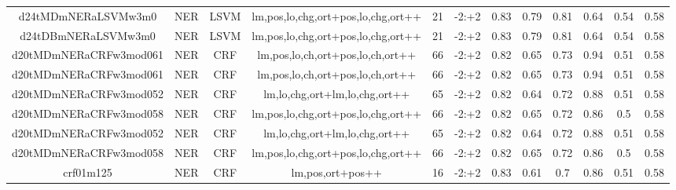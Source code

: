 \documentclass[a4paper]{article}
\begin{document}
\begin{landscape}
\begin{center}
\begin{tabular}{ |c|c|c|c|c|c|c|c|c|c|c|c|}
 
 	
 	\small{ d24tMDmNERaLSVMw3m0 } & \small{ NER} & \small{  LSVM }  & lm,pos,lo,chg,ort+pos,lo,chg,ort++  &  21 &  \small{  -2:+2 }  &  0.83 & 0.79 & 0.81  &  0.64 & 0.54 & 0.58 \\
 	

 
 	
 	\small{ d24tDBmNERaLSVMw3m0 } & \small{ NER} & \small{  LSVM }  & lm,pos,lo,chg,ort+pos,lo,chg,ort++  &  21 &  \small{  -2:+2 }  &  0.83 & 0.79 & 0.81  &  0.64 & 0.54 & 0.58 \\
 	

 
 	
 	\small{ d20tMDmNERaCRFw3mod061 } & \small{ NER} & \small{  CRF }  & lm,pos,lo,ch,ort+pos,lo,ch,ort++  &  66 &  \small{  -2:+2 }  &  0.82 & 0.65 & 0.73  &  0.94 & 0.51 & 0.58 \\
 	

 
 	
 	\small{ d20tMDmNERaCRFw3mod061 } & \small{ NER} & \small{  CRF }  & lm,pos,lo,ch,ort+pos,lo,ch,ort++  &  66 &  \small{  -2:+2 }  &  0.82 & 0.65 & 0.73  &  0.94 & 0.51 & 0.58 \\
 	

 
 	
 	\small{ d20tMDmNERaCRFw3mod052 } & \small{ NER} & \small{  CRF }  & lm,lo,chg,ort+lm,lo,chg,ort++  &  65 &  \small{  -2:+2 }  &  0.82 & 0.64 & 0.72  &  0.88 & 0.51 & 0.58 \\
 	

 
 	
 	\small{ d20tMDmNERaCRFw3mod058 } & \small{ NER} & \small{  CRF }  & lm,pos,lo,chg,ort+pos,lo,chg,ort++  &  66 &  \small{  -2:+2 }  &  0.82 & 0.65 & 0.72  &  0.86 & 0.5 & 0.58 \\
 	

 
 	
 	\small{ d20tMDmNERaCRFw3mod052 } & \small{ NER} & \small{  CRF }  & lm,lo,chg,ort+lm,lo,chg,ort++  &  65 &  \small{  -2:+2 }  &  0.82 & 0.64 & 0.72  &  0.88 & 0.51 & 0.58 \\
 	

 
 	
 	\small{ d20tMDmNERaCRFw3mod058 } & \small{ NER} & \small{  CRF }  & lm,pos,lo,chg,ort+pos,lo,chg,ort++  &  66 &  \small{  -2:+2 }  &  0.82 & 0.65 & 0.72  &  0.86 & 0.5 & 0.58 \\
 	

 
 	
 	\small{ crf01m125 } & \small{ NER} & \small{  CRF }  & lm,pos,ort+pos++  &  16 &  \small{  -2:+2 }  &  0.83 & 0.61 & 0.7  &  0.86 & 0.51 & 0.58 \\
 	


\end{tabular}
\end{center}
\end{landscape}
\end{document}
